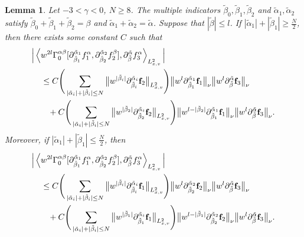 \documentclass[reqno]{amsart}
\numberwithin{equation}{section}
\newtheorem{lemma}[theorem]{Lemma}
\numberwithin{equation}{section}
\begin{document}
	
	\begin{lemma}\label{estimatesofnonlinears}
		Let $-3 < \gamma < 0$, $N \geq 8$. The multiple indicators $\tilde{\beta}_0, \tilde{\beta}_1, \tilde{\beta}_2$ and $\tilde{\alpha}_1, \tilde{\alpha}_2$ satisfy $\tilde{\beta}_0 + \tilde{\beta}_1 + \tilde{\beta}_2 = \beta$ and $\tilde{\alpha}_1 + \tilde{\alpha}_2 = \tilde{\alpha}$. Suppose  that $|\tilde{\beta}|\leq l$.  If $|\tilde{\alpha}_1|+|\tilde{\beta}_1|\geq \frac{N}{2}$, then  there exists some constant $C$ such that 
		\begin{align}
		&	\Big| \left\langle w^{2l}\Gamma^{\alpha \beta}_0 [\partial_{\tilde{\beta}_1}^{\tilde{\alpha}_1}f^{\alpha}_1, \partial_{\tilde{\beta}_2}^{\tilde{\alpha}_2}f^{\beta}_2],  \partial_{\tilde{\beta}}^{\tilde{\alpha}}f^{\alpha}_3 \right\rangle_{L_{x,v}^2} \Big|\notag	\\
			& \hspace{0.4cm} \leq C \Bigg(\sum_{|\tilde{\alpha}_i|+|\tilde{\beta}_i|\leq N}\big\Vert w^{|\tilde{\beta}_i|}\partial_{\tilde{\beta}_i}^{\tilde{\alpha}_i}\mathbf{f}_2\big\Vert_{L^{2}_{x,v}} \Bigg)\big\Vert w^{l}\partial_{\tilde{\beta}_1}^{\tilde{\alpha}_1}\mathbf{f}_1\big\Vert_{\nu} \big\Vert w^{l}\partial_{\tilde{\beta}}^{\tilde{\alpha}}\mathbf{f}_3\big\Vert_{\nu}\label{lem31nonl3f} \\
			& \hspace{0.7cm} + C \Bigg(\sum_{|\tilde{\alpha}_i|+|\tilde{\beta}_i|\leq N}\big\Vert w^{|\tilde{\beta}_2|}\partial_{\tilde{\beta}_2}^{\tilde{\alpha}_i}\mathbf{f}_2\big\Vert_{L^{2}_{x,v}} \Bigg)\big\Vert w^{l-|\tilde{\beta}_2|}\partial_{\tilde{\beta}_1}^{\tilde{\alpha}_1}\mathbf{f}_1\big\Vert_{\nu} \big\Vert w^{l}\partial_{\tilde{\beta}}^{\tilde{\alpha}}\mathbf{f}_3\big\Vert_{\nu}.\notag
		\end{align}
		Moreover, if $|\tilde{\alpha}_1|+|\tilde{\beta}_1|\leq \frac{N}{2}$, then
		\begin{align}
			&	\Big| \left\langle w^{2l}\Gamma^{\alpha \beta}_0 [\partial_{\tilde{\beta}_1}^{\tilde{\alpha}_1}f^{\alpha}_1, \partial_{\tilde{\beta}_2}^{\tilde{\alpha}_2}f^{\beta}_2],  \partial_{\tilde{\beta}}^{\tilde{\alpha}}f^{\alpha}_3 \right\rangle_{L_{x,v}^2} \Big|	\notag\\
			& \hspace{0.4cm} \leq C \Bigg(\sum_{|\tilde{\alpha}_i|+|\tilde{\beta}_i|\leq N}\big\Vert w^{|\tilde{\beta}_i|}\partial_{\tilde{\beta}_i}^{\tilde{\alpha}_i}\mathbf{f}_1\big\Vert_{L^{2}_{x,v}} \Bigg)\big\Vert w^{l}\partial_{\tilde{\beta}_2}^{\tilde{\alpha}_2}\mathbf{f}_2\big\Vert_{\nu} \big\Vert w^{l}\partial_{\tilde{\beta}}^{\tilde{\alpha}}\mathbf{f}_3\big\Vert_{\nu}\label{lem31nonl3s} \\
			& \hspace{0.7cm} + C \Bigg(\sum_{|\tilde{\alpha}_i|+|\tilde{\beta}_i|\leq N}\big\Vert w^{|\tilde{\beta}_1|}\partial_{\tilde{\beta}_1}^{\tilde{\alpha}_i}\mathbf{f}_1\big\Vert_{L^{2}_{x,v}} \Bigg)\big\Vert w^{l-|\tilde{\beta}_1|}\partial_{\tilde{\beta}_2}^{\tilde{\alpha}_2}\mathbf{f}_2\big\Vert_{\nu} \big\Vert w^{l}\partial_{\tilde{\beta}}^{\tilde{\alpha}}\mathbf{f}_3\big\Vert_{\nu}.\notag
		\end{align}
		\end{lemma}
		
\end{document}
